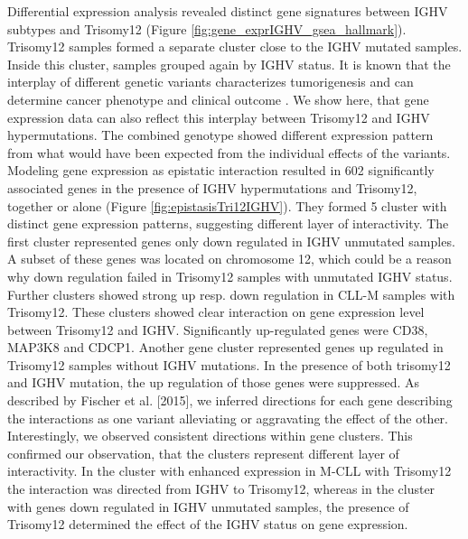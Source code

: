 Differential expression analysis revealed distinct gene signatures between IGHV subtypes and Trisomy12 (Figure \ref{fig:gene_exprIGHV_gsea_hallmark}). Trisomy12 samples formed a separate cluster close to the IGHV mutated samples. Inside this cluster, samples grouped again by IGHV status. It is known that the interplay of different genetic variants characterizes tumorigenesis and can determine cancer phenotype and clinical outcome \citep{Landau2015}. We show here, that gene expression data can also reflect this interplay between Trisomy12 and IGHV hypermutations. The combined genotype showed different expression pattern from what would have been expected from the individual effects of the variants. Modeling gene expression as epistatic interaction resulted in 602 significantly associated genes in the presence of IGHV hypermutations and Trisomy12, together or alone (Figure \ref{fig:epistasisTri12IGHV}). They formed 5 cluster with distinct gene expression patterns, suggesting different layer of interactivity. The first cluster represented genes only down regulated in IGHV unmutated samples. A subset of these genes was located on chromosome 12, which could be a reason why down regulation failed in Trisomy12 samples with unmutated IGHV status. Further clusters showed strong up resp. down regulation in CLL-M samples with Trisomy12. These clusters showed clear interaction on gene expression level between Trisomy12 and IGHV. Significantly up-regulated genes were CD38, MAP3K8 and CDCP1. Another gene cluster represented genes up regulated in Trisomy12 samples without IGHV mutations. In the presence of both trisomy12 and IGHV mutation, the up regulation of those genes were suppressed. As described by Fischer et al. [2015], we inferred directions for each gene describing the interactions as one variant alleviating or aggravating the effect of the other. Interestingly, we observed consistent directions within gene clusters. This confirmed our observation, that the clusters represent different layer of interactivity. In the cluster with enhanced expression in M-CLL with Trisomy12 the interaction was directed from IGHV to Trisomy12, whereas in the cluster with genes down regulated in IGHV unmutated samples, the presence of Trisomy12 determined the effect of the IGHV status on gene expression.       


\FloatBarrier

